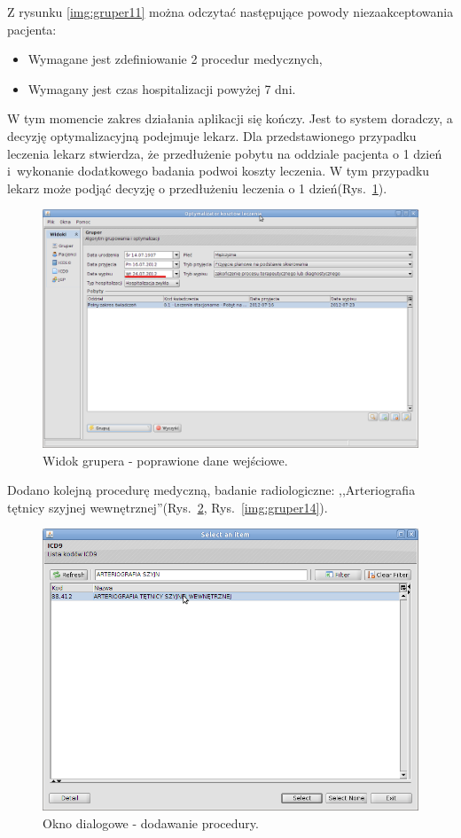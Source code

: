Z rysunku \ref{img:gruper11} można odczytać następujące powody niezaakceptowania pacjenta:
\begin{itemize}
 \item Wymagane jest zdefiniowanie 2 procedur medycznych,
 \item Wymagany jest czas hospitalizacji powyżej 7 dni.
\end{itemize}

W tym momencie zakres działania aplikacji się kończy. Jest to system doradczy, a decyzję optymalizacyjną podejmuje lekarz. Dla przedstawionego przypadku leczenia lekarz stwierdza, że przedłużenie pobytu na oddziale pacjenta o 1 dzień i~wykonanie dodatkowego badania podwoi koszty leczenia. W tym przypadku lekarz może podjąć decyzję o przedłużeniu leczenia o 1 dzień(Rys.~\ref{img:gruper12}).

\begin{figure}%
\centering
\includegraphics[scale=0.4]{images/gruper12}
\caption[Widok grupera]{Widok grupera - poprawione dane wejściowe.}
\label{img:gruper12}
\end{figure}

Dodano kolejną procedurę medyczną, badanie radiologiczne: ,,Arteriografia tętnicy szyjnej wewnętrznej''(Rys.~\ref{img:gruper13}, Rys.~\ref{img:gruper14}).

\begin{figure}%
\centering
\includegraphics[scale=0.4]{images/gruper13}
\caption[Widok grupera]{Okno dialogowe - dodawanie procedury.}
\label{img:gruper13}
\end{figure}

